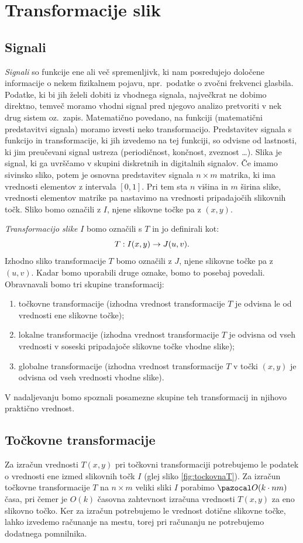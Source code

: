 \section{Transformacije slik}\label{sec:TransformacijeSlik}
%
\subsection{Signali}\label{sec:Signali}
%
\emph{Signali} so funkcije ene ali več spremenljivk, ki nam posredujejo določene informacije o nekem fizikalnem pojavu, npr.\ podatke o zvočni frekvenci glasbila. Podatke, ki bi jih želeli dobiti iz vhodnega signala, največkrat ne dobimo direktno, temveč moramo vhodni signal pred njegovo analizo pretvoriti v nek drug sistem oz.\ zapis. Matematično povedano, na funkciji (matematični predstavitvi signala) moramo izvesti neko transformacijo. Predstavitev signala s funkcijo in transformacije, ki jih izvedemo na tej funkciji, so odvisne od lastnosti, ki jim preučevani signal ustreza (periodičnost, končnost, zveznost \ldots).
%
Slika je signal, ki ga uvrščamo v skupini diskretnih in digitalnih signalov. Če imamo sivinsko sliko, potem je osnovna predstavitev signala $n \times m$ matrika, ki ima vrednosti elementov z intervala $[0, 1]$. Pri tem sta $n$ višina in $m$ širina slike, vrednosti elementov matrike pa nastavimo na vrednosti pripadajočih slikovnih točk. Sliko bomo označili z $I$, njene slikovne točke pa z $(x, y)$.

\emph{Transformacijo slike} $I$ bomo označili s $T$ in jo definirali kot:
%
$$T : I(x, y) \to J(u, v).$$
%
Izhodno sliko transformacije $T$ bomo označili z $J$, njene slikovne točke pa z $(u,v)$. Kadar bomo uporabili druge oznake, bomo to posebaj povedali.
Obravnavali bomo tri skupine transformacij:
%
\begin{enumerate}
\item točkovne transformacije (izhodna vrednost transformacije $T$ je odvisna le od vrednosti ene slikovne točke); 
\item lokalne transformacije (izhodna vrednost transformacije $T$ je odvisna od vseh vrednosti v soseski pripadajoče slikovne točke vhodne slike);
\item globalne transformacije (izhodna vrednost transformacije $T$ v točki $(x, y)$ je odvisna od vseh vrednosti vhodne slike).
\end{enumerate}
%
V nadaljevanju bomo spoznali posamezne skupine teh transformacij in njihovo praktično vrednost.
%
\subsection{Točkovne transformacije}
%
Za izračun vrednosti $T(x, y)$ pri točkovni transformaciji potrebujemo le podatek o vrednosti ene izmed slikovnih točk $I$ (glej sliko \ref{fig:tockovnaT}). Za izračun točkovne transformacije $T$ na $n \times m$ veliki sliki $I$ porabimo $\O(k\cdot nm)$ časa, pri čemer je $O(k)$ časovna zahtevnost izračuna vrednosti $T(x, y)$ za eno slikovno točko. Ker za izračun potrebujemo le vrednost dotične slikovne točke, lahko izvedemo računanje na mestu, torej pri računanju ne potrebujemo dodatnega pomnilnika.

